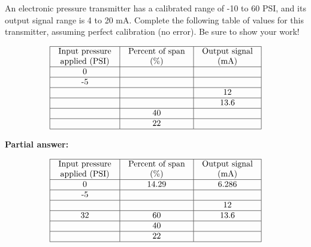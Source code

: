 

An electronic pressure transmitter has a calibrated range of -10 to 60 PSI, and its output signal range is 4 to 20 mA.  Complete the following table of values for this transmitter, assuming perfect calibration (no error).  Be sure to show your work!


$$\vbox{\offinterlineskip
\halign{\strut
\vrule \quad\hfil # \ \hfil & 
\vrule \quad\hfil # \ \hfil & 
\vrule \quad\hfil # \ \hfil \vrule \cr
\noalign{\hrule}
%
Input pressure & Percent of span & Output signal \cr
%
applied (PSI) & (\%) & (mA) \cr
%
\noalign{\hrule}
%
0 &  &  \cr
%
\noalign{\hrule}
%
-5 &  &  \cr
%
\noalign{\hrule}
%
 &  & 12 \cr
%
\noalign{\hrule}
%
 &  & 13.6 \cr
%
\noalign{\hrule}
%
 & 40 &  \cr
%
\noalign{\hrule}
%
 & 22 &  \cr
%
\noalign{\hrule}
} %
}$$ %







\noindent
{\bf Partial answer:}


$$\vbox{\offinterlineskip
\halign{\strut
\vrule \quad\hfil # \ \hfil & 
\vrule \quad\hfil # \ \hfil & 
\vrule \quad\hfil # \ \hfil \vrule \cr
\noalign{\hrule}
%
Input pressure & Percent of span & Output signal \cr
%
applied (PSI) & (\%) & (mA) \cr
%
\noalign{\hrule}
%
0 & 14.29 & 6.286 \cr
%
\noalign{\hrule}
%
-5 &  &  \cr
%
\noalign{\hrule}
%
 &  & 12 \cr
%
\noalign{\hrule}
%
32 & 60 & 13.6 \cr
%
\noalign{\hrule}
%
 & 40 &  \cr
%
\noalign{\hrule}
%
 & 22 &  \cr
%
\noalign{\hrule}
} %
}$$ %








